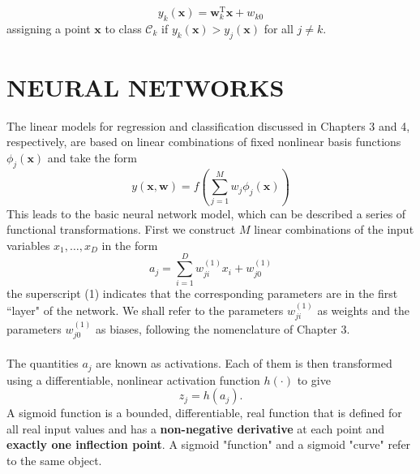 \documentclass{article}
\begin{document}
	$$
	y_{k}(\mathbf{x})=\mathbf{w}_{k}^{\mathrm{T}} \mathbf{x}+w_{k 0}
	$$
	assigning a point $\mathbf{x}$ to class $\mathcal{C}_{k}$ if $y_{k}(\mathbf{x})>y_{j}(\mathbf{x})$ for all $j \neq k$.
	
	\pagebreak
	\section{NEURAL NETWORKS}
	The linear models for regression and classification discussed in Chapters 3 and 4, respectively, are based on linear combinations of fixed nonlinear basis functions $\phi_{j}(\mathbf{x})$ and take the form
	$$
	y(\mathbf{x}, \mathbf{w})=f\left(\sum_{j=1}^{M} w_{j} \phi_{j}(\mathbf{x})\right)
	$$
	 This leads to the basic neural network model, which can be described a series of functional transformations. First we construct $M$ linear combinations of the input variables $x_{1}, \ldots, x_{D}$ in the form
	 $$
	 a_{j}=\sum_{i=1}^{D} w_{j i}^{(1)} x_{i}+w_{j 0}^{(1)}
	 $$
	 the superscript (1) indicates that the corresponding parameters are in the first ``layer" of the network. We shall refer to the parameters $w_{j i}^{(1)}$ as weights and the parameters $w_{j 0}^{(1)}$ as biases, following the nomenclature of Chapter 3.\\\\
	 The quantities $a_{j}$ are known as activations. Each of them is then transformed using a differentiable, nonlinear activation function $h(\cdot)$ to give
	 $$
	 z_{j}=h\left(a_{j}\right) .
	 $$
	 A sigmoid function is a bounded, differentiable, real function that is defined for all real input values and has a \textbf{non-negative derivative} at each point and \textbf{exactly one inflection point}. A sigmoid "function" and a sigmoid "curve" refer to the same object.
	 
	\pagebreak
\end{document}
